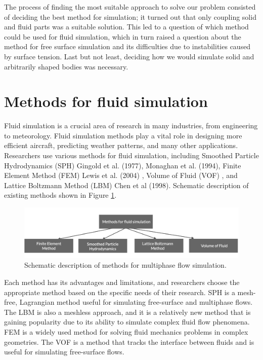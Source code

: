 The process of finding the most suitable approach to solve our problem consisted of deciding the best method for simulation; it turned out that only coupling solid and fluid parts was a suitable solution. This led to a question of which method could be used for fluid simulation, which in turn raised a question about the method for free surface simulation and its difficulties due to instabilities caused by surface tension. Last but not least, deciding how we would simulate solid and arbitrarily shaped bodies was necessary.

\section{Methods for fluid simulation}

Fluid simulation is a crucial area of research in many industries, from engineering to meteorology. Fluid simulation methods play a vital role in designing more efficient aircraft, predicting weather patterns, and many other applications. Researchers use various methods for fluid simulation, including Smoothed Particle Hydrodynamics (\ac{SPH}) Gingold et al. (1977), Monaghan et al. (1994)\cite{gingold1977SPH, monaghan1994SPH}, Finite Element Method (\ac{FEM}) Lewis et al. (2004) \cite{lewis2004fundamentals}, Volume of Fluid (\ac{VOF}) \cite{hirt1981volume}, and Lattice Boltzmann Method (\ac{LBM}) Chen et al (1998)\cite{chen1998lattice}. Schematic description of existing methods shown in Figure \ref{fig:methods_for_fluids}.
\begin{figure}[!ht]
    \centering
    \includegraphics[width=15cm]{GWU_Thesis_Sarmakeeva/Images/chap1/methods_for_fluids.png}
    \caption{Schematic description of methods for multiphase flow simulation.}
    \label{fig:methods_for_fluids}
\end{figure}
Each method has its advantages and limitations, and researchers choose the appropriate method based on the specific needs of their research. SPH is a mesh-free, Lagrangian method useful for simulating free-surface and multiphase flows. The LBM is also a meshless approach, and it is a relatively new method that is gaining popularity due to its ability to simulate complex fluid flow phenomena. FEM is a widely used method for solving fluid mechanics problems in complex geometries. The VOF is a method that tracks the interface between fluids and is useful for simulating free-surface flows.

